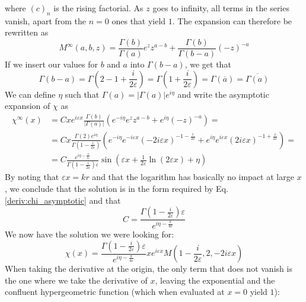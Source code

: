 where \((c)_n\) is the rising factorial. As \(z\) goes to infinity, all terms in the series vanish, apart from the \(n=0\) ones that yield \(1\). The expansion can therefore be rewritten as
\begin{equation}\label{deriv:Mexpansion}
	M^{\infty} (a,b,z) =
	\frac{\Gamma (b)}{\Gamma (a)} e^z z^{a-b} +
	\frac{\Gamma (b)}{\Gamma (b-a)}(-z)^{-a}
\end{equation}
If we insert our values for \(b\) and \(a\) into \(\Gamma (b-a)\), we get that
\begin{equation}
	\Gamma (b-a) = \Gamma \left( 2- 1 + \frac{i}{2\varepsilon } \right) = \Gamma \left( 1+ \frac{i}{2 \varepsilon } \right) = \Gamma (\overline{a})= \overline{\Gamma (a)}
\end{equation}
We can define \(\eta \) such that \(\Gamma (a) = \vert \Gamma (a) \vert e^{i \eta } \) and write the asymptotic expansion of \(\chi \) as
\begin{align}
	\chi^{\infty}(x) &= Cxe^{i\varepsilon x} \frac{\Gamma (b)}{\vert \Gamma (a) \vert }
	\left( e^{-i \eta } e^z	z^{a-b} + e^{i \eta } (-z)^{-a}  \right) =\\
	&= C x \frac{\Gamma (2) e^{i \eta }}{\Gamma \left(1-\frac{i}{2\varepsilon }\right)}\left( e^{-i \eta } e^{-i\varepsilon x}(-2i\varepsilon x)^{-1-\frac{i}{2\varepsilon }} + e^{i \eta } e^{i \varepsilon x} (2i \varepsilon x)^{-1+ \frac{i}{2\varepsilon }} \right)=\\
	&=C \frac{e^{i \eta - \frac{\pi}{4 \varepsilon }}}{\Gamma \left( 1-\frac{i}{2\varepsilon } \right) \varepsilon } \sin \left( \varepsilon x + \frac{1}{2\varepsilon} \ln (2\varepsilon x) + \eta \right)
\end{align}
By noting that \(\varepsilon x= kr\) and that the logarithm has basically no impact at large \(x\), we conclude that the solution is in the form required by Eq. \eqref{deriv:chi_asymptotic} and that
\begin{equation}
	C = \frac{\Gamma \left( 1- \frac{i}{2\varepsilon }\right) \varepsilon }{e^{i \eta - \frac{\pi}{4 \varepsilon }}}
\end{equation}
We now have the solution we were looking for:
\begin{equation}\label{deriv:solution}
	\chi (x) = \frac{\Gamma \left(1-\frac{i}{2\varepsilon }\right) \varepsilon }{e^{i \eta - \frac{\pi}{4 \varepsilon }}}x e^{i\varepsilon x}M\left(1-\frac{i}{2\varepsilon },2,-2i \varepsilon x\right) 
\end{equation}
When taking the derivative at the origin, the only term that does not vanish is the one where we take the derivative of \(x \), leaving the exponential and the confluent hypergeometric function (which when evaluated at \(x=0\) yield \(1\)):
